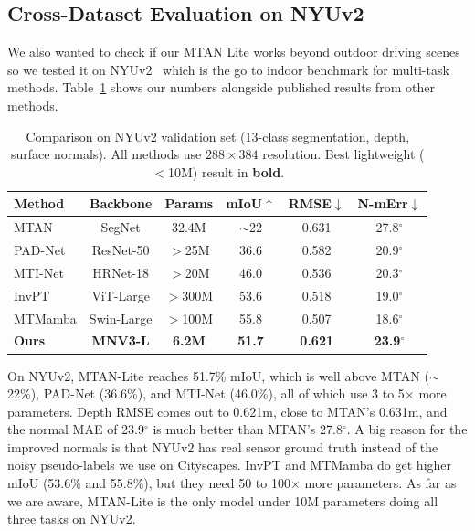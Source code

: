 \documentclass[journal, onecolumn]{IEEEtran}
\begin{document}
\FloatBarrier
\subsection{Cross-Dataset Evaluation on NYUv2}

We also wanted to check if our MTAN Lite works beyond outdoor driving scenes so we tested it on NYUv2~\cite{silberman2012nyu} which is the go to indoor benchmark for multi-task methods. Table~\ref{tab:nyuv2_results} shows our numbers alongside published results from other methods.

\begin{table}[!htbp]
\centering
\caption{Comparison on NYUv2 validation set (13-class segmentation, depth, surface normals). All methods use $288 \times 384$ resolution. Best lightweight ($<$10M) result in \textbf{bold}.}
\label{tab:nyuv2_results}
\renewcommand{\arraystretch}{1.2}
\begin{tabular}{lccccc}
\hline
\textbf{Method} & \textbf{Backbone} & \textbf{Params} & \textbf{mIoU$\uparrow$} & \textbf{RMSE$\downarrow$} & \textbf{N-mErr$\downarrow$} \\
\hline
MTAN & SegNet & 32.4M & $\sim$22 & 0.631 & 27.8$^\circ$ \\
PAD-Net & ResNet-50 & $>$25M & 36.6 & 0.582 & 20.9$^\circ$ \\
MTI-Net & HRNet-18 & $>$20M & 46.0 & 0.536 & 20.3$^\circ$ \\
InvPT & ViT-Large & $>$300M & 53.6 & 0.518 & 19.0$^\circ$ \\
MTMamba & Swin-Large & $>$100M & 55.8 & 0.507 & 18.6$^\circ$ \\
\hline
\textbf{Ours} & \textbf{MNV3-L} & \textbf{6.2M} & \textbf{51.7} & \textbf{0.621} & \textbf{23.9$^\circ$} \\
\hline
\end{tabular}
\end{table}

On NYUv2, MTAN-Lite reaches 51.7\% mIoU, which is well above MTAN ($\sim$22\%), PAD-Net (36.6\%), and MTI-Net (46.0\%), all of which use 3 to 5$\times$ more parameters. Depth RMSE comes out to 0.621m, close to MTAN's 0.631m, and the normal MAE of 23.9$^\circ$ is much better than MTAN's 27.8$^\circ$. A big reason for the improved normals is that NYUv2 has real sensor ground truth instead of the noisy pseudo-labels we use on Cityscapes. InvPT and MTMamba do get higher mIoU (53.6\% and 55.8\%), but they need 50 to 100$\times$ more parameters. As far as we are aware, MTAN-Lite is the only model under 10M parameters doing all three tasks on NYUv2.
\end{document}
